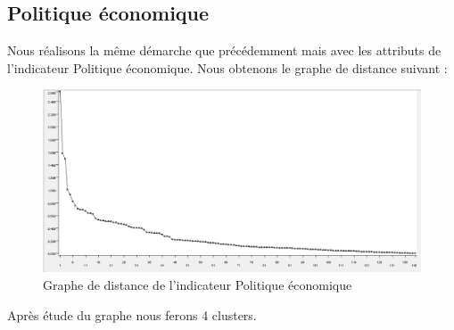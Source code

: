 \subsection{Politique économique}
Nous réalisons la même démarche que précédemment mais avec les attributs de l'indicateur Politique économique. Nous obtenons le graphe de distance suivant : 
\begin{figure}[H]
	\begin{center}
		\includegraphics[scale=0.5]{Image/DistancePolitiqueNoMissing2}
		\caption{Graphe de distance de l'indicateur Politique économique\jeuc}
	\end{center}
\end{figure}

Après étude du graphe nous ferons 4 clusters.